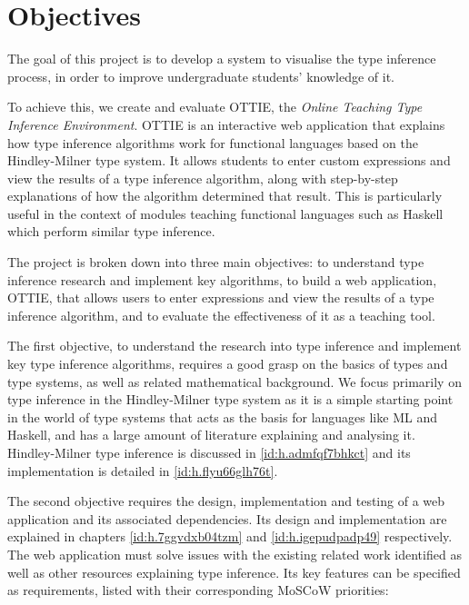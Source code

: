 \documentclass[a4paper,fleqn,oneside,12pt]{report}
\begin{document}
\section{Objectives}

The goal of this project is to develop a system to visualise the type inference process, in order to improve undergraduate students' knowledge of it.

To achieve this, we create and evaluate OTTIE, the \textit{Online Teaching Type Inference Environment}. OTTIE is an interactive web application that explains how type inference algorithms work for functional languages based on the Hindley-Milner type system. It allows students to enter custom expressions and view the results of a type inference algorithm, along with step-by-step explanations of how the algorithm determined that result. This is particularly useful in the context of modules teaching functional languages such as Haskell which perform similar type inference.

The project is broken down into three main objectives: to understand type inference research and implement key algorithms, to build a web application, OTTIE, that allows users to enter expressions and view the results of a type inference algorithm, and to evaluate the effectiveness of it as a teaching tool.

The first objective, to understand the research into type inference and implement key type inference algorithms, requires a good grasp on the basics of types and type systems, as well as related mathematical background. We focus primarily on type inference in the Hindley-Milner type system as it is a simple starting point in the world of type systems that acts as the basis for languages like ML and Haskell, and has a large amount of literature explaining and analysing it. Hindley-Milner type inference is discussed in \cref{id:h.admfqf7bhkct} and its implementation is detailed in \cref{id:h.flyu66glh76t}.

The second objective requires the design, implementation and testing of a web application and its associated dependencies. Its design and implementation are explained in chapters \ref{id:h.7ggvdxb04tzm} and \ref{id:h.igepudpadp49} respectively. The web application must solve issues with the existing related work identified as well as other resources explaining type inference. Its key features can be specified as requirements, listed with their corresponding MoSCoW priorities:
\end{document}
